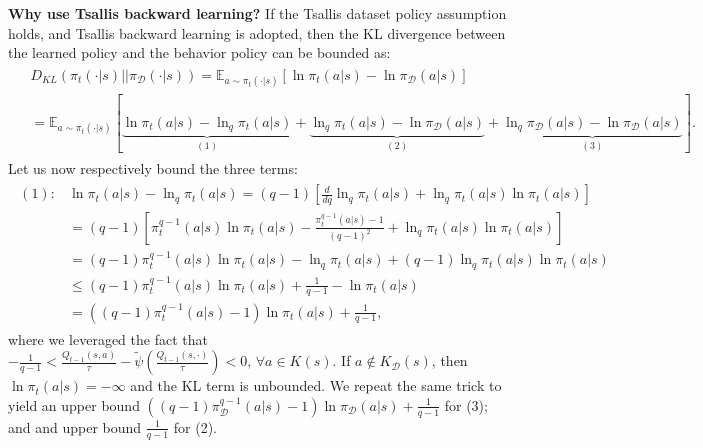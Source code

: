 \documentclass{article}
\newcommand{\AdaBracket}[1]{\left(#1\right)}
\newcommand{\AdaRectBracket}[1]{\left[#1\right]}
\newcommand{\expectation}[2]{\mathbb{E}_{#1}\AdaRectBracket{#2}}
\newcommand{\KLany}[2]{D_{\!K\!L}\!\left(#1 \left|  \right| #2 \right)}
\newcommand{\datasetPolicy}{\pi_{\mathcal{D}}}
\begin{document}
\textbf{Why use Tsallis backward learning? }
If the Tsallis dataset policy assumption holds, and Tsallis backward learning is adopted, 
then the KL divergence between the learned policy and the behavior policy can be bounded as:
\begin{align}
    \begin{split}
        &\KLany{\pi_t(\cdot|s)}{\datasetPolicy(\cdot|s)} = \expectation{a\sim\pi_{t}(\cdot | s)}{\ln \pi_{t}(a|s) - \ln\datasetPolicy(a|s)} \\
        & = \expectation{a\sim\pi_{t}(\cdot | s)}{\underbrace{\ln \pi_{t}(a|s) - \ln_q\pi_{t}(a|s)}_{(1)} + \underbrace{\ln_q\pi_{t}(a|s) -  \ln\datasetPolicy(a|s)}_{(2)} + \underbrace{\ln_q\datasetPolicy(a|s) - \ln\datasetPolicy(a|s)}_{(3)} } .
    \end{split}
\end{align}
Let us now respectively bound the three terms:
\begin{align}
    \begin{split}
        (1): &\ln \pi_{t}(a|s) - \ln_q\pi_{t}(a|s) = (q-1) \AdaRectBracket{\frac{d}{dq}\ln_q \pi_t(a|s) + \ln_q\pi_t(a|s)\ln\pi_t(a|s)}\\
        &= (q-1)\AdaRectBracket{\pi_t^{q-1}(a|s)\ln\pi_t(a|s) - \frac{\pi_{t}^{q-1}(a|s)-1}{(q-1)^2} + \ln_q\pi_t(a|s)\ln\pi_t(a|s)}\\
        &= (q-1)\pi_{t}^{q-1}(a|s)\ln\pi_t(a|s) - \ln_q\pi_t(a|s) + (q-1)\ln_q\pi_t(a|s)\ln\pi_t(a|s)\\
        & \leq (q-1)\pi_{t}^{q-1}(a|s)\ln\pi_t(a|s) + \frac{1}{q-1} - \ln\pi_t (a|s)\\
        &=  \AdaBracket{ (q-1)\pi_{t}^{q-1}(a|s) - 1}\ln\pi_t(a|s) + \frac{1}{q-1},
    \end{split}
\end{align}
where we leveraged the fact that $-\frac{1}{q-1} < \frac{Q_{t-1}(s,a)}{\tau} - \tilde{\psi}\AdaBracket{\frac{Q_{t-1}(s,\cdot)}{\tau}} < 0, \, \forall a\in K(s)$. If $a \notin K_{\mathcal{D}}(s)$, then $\ln\pi_t(a|s) = -\infty$ and the KL term is unbounded.
We repeat the same trick to yield an upper bound $\AdaBracket{ (q-1)\datasetPolicy^{q-1}(a|s) - 1}\ln\datasetPolicy(a|s) + \frac{1}{q-1}$  for (3); and and upper bound $\frac{1}{q-1}$  for (2).
\end{document}
